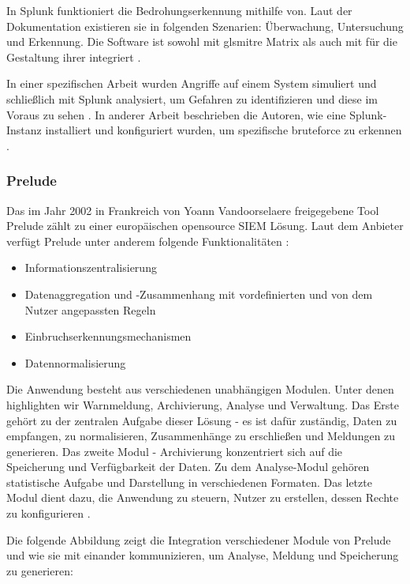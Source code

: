In Splunk funktioniert die Bedrohungserkennung mithilfe von. Laut der Dokumentation existieren sie in folgenden Szenarien: Überwachung, Untersuchung und Erkennung. Die Software ist sowohl mit gls{mitre} Matrix als auch mit  für die Gestaltung ihrer  integriert \citep{Splunk_usecases}. 

In einer spezifischen Arbeit wurden Angriffe auf einem System simuliert und schließlich mit Splunk analysiert, um Gefahren zu identifizieren und diese im Voraus zu sehen \citep{Su_SplunkDDOS}. In anderer Arbeit beschrieben die Autoren, wie eine Splunk-Instanz installiert und konfiguriert wurden, um spezifische \gls{bruteforce} zu erkennen \citep{Selvaganesh_SplunkBruteForce}.
 
\subsubsection{Prelude}
Das im Jahr 2002 in Frankreich von Yoann Vandoorselaere freigegebene Tool Prelude zählt zu einer europäischen \gls{opensource} \gls{SIEM} Lösung. Laut dem Anbieter verfügt Prelude unter anderem folgende Funktionalitäten \citep{Prelude_SIEM}: 

\begin{itemize}[noitemsep]
   \item	Informationszentralisierung 
   \item	Datenaggregation und -Zusammenhang mit vordefinierten und von dem Nutzer angepassten Regeln 
   \item	Einbruchserkennungsmechanismen 
   \item	Datennormalisierung 
\end{itemize}

Die Anwendung besteht aus verschiedenen unabhängigen Modulen. Unter denen highlighten wir Warnmeldung, Archivierung, Analyse und Verwaltung. Das Erste gehört zu der zentralen Aufgabe dieser Lösung - es ist dafür zuständig, Daten zu empfangen, zu normalisieren, Zusammenhänge zu erschließen und Meldungen zu generieren. Das zweite Modul - Archivierung konzentriert sich auf die Speicherung und Verfügbarkeit der Daten. Zu dem Analyse-Modul gehören statistische Aufgabe und Darstellung in verschiedenen Formaten. Das letzte Modul dient dazu, die Anwendung zu steuern, Nutzer zu erstellen, dessen Rechte zu konfigurieren \citep{EC_Prelude}. 

Die folgende Abbildung zeigt die Integration verschiedener Module von Prelude und wie sie mit einander kommunizieren, um Analyse, Meldung und Speicherung zu generieren:

